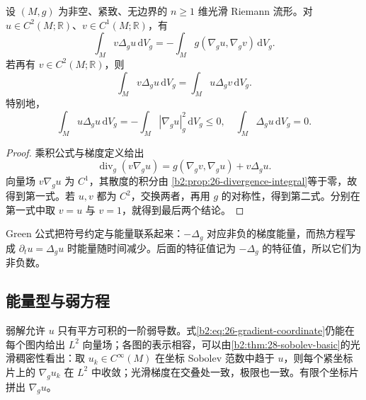\begin{proposition}[Green 公式]
\label{b2:prop:26-green}
设 \((M,g)\) 为非空、紧致、无边界的 \(n\geq1\) 维光滑 Riemann 流形。对 \(u\in C^2(M;\mathbb R)\)、\(v\in C^1(M;\mathbb R)\)，有
\begin{equation}
\label{b2:eq:26-green-first}
 \int_Mv\Delta_g u\,\mathrm dV_g
 =-\int_Mg(\nabla_g u,\nabla_g v)\,\mathrm dV_g.
\end{equation}
若再有 \(v\in C^2(M;\mathbb R)\)，则
\[
 \int_Mv\Delta_g u\,\mathrm dV_g
 =\int_Mu\Delta_g v\,\mathrm dV_g.
\]
特别地，
\[
 \int_Mu\Delta_g u\,\mathrm dV_g
 =-\int_M|\nabla_g u|_g^2\,\mathrm dV_g\leq0,
 \quad \int_M\Delta_g u\,\mathrm dV_g=0.
\]
\end{proposition}
\begin{proof}
乘积公式与梯度定义给出
\[
 \operatorname{div}_g(v\nabla_g u)
 =g(\nabla_g v,\nabla_g u)+v\Delta_g u.
\]
向量场 \(v\nabla_g u\) 为 \(C^1\)，其散度的积分由
\cref{b2:prop:26-divergence-integral}等于零，故得到第一式。若 \(u,v\) 都为 \(C^2\)，交换两者，再用 \(g\) 的对称性，得到第二式。分别在第一式中取 \(v=u\) 与 \(v=1\)，就得到最后两个结论。
\end{proof}

Green 公式把符号约定与能量联系起来：\(-\Delta_g\) 对应非负的梯度能量，而热方程写成 \(\partial_tu=\Delta_g u\) 时能量随时间减少。后面的特征值记为 \(-\Delta_g\) 的特征值，所以它们为非负数。

\subsection{能量型与弱方程}
\label{b2:subsec:260203}

弱解允许 \(u\) 只有平方可积的一阶弱导数。式\eqref{b2:eq:26-gradient-coordinate}仍能在每个图内给出 \(L^2\) 向量场；各图的表示相容，可以由\cref{b2:thm:28-sobolev-basic}的光滑稠密性看出：取 \(u_k\in C^\infty(M)\) 在坐标 Sobolev 范数中趋于 \(u\)，则每个紧坐标片上的 \(\nabla_g u_k\) 在 \(L^2\) 中收敛；光滑梯度在交叠处一致，极限也一致。有限个坐标片拼出 \(\nabla_g u\)。

